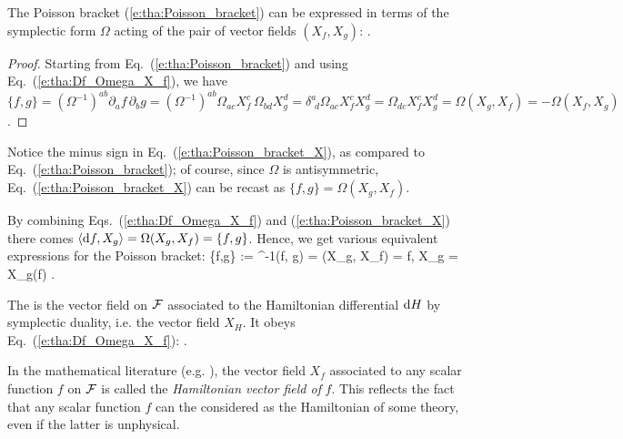 The Poisson bracket (\ref{e:tha:Poisson_bracket}) can be expressed
in terms of the symplectic form $\Omega$ acting of the pair of
vector fields $(X_f, X_g)$:
\be \label{e:tha:Poisson_bracket_X}
    .
\ee
\begin{proof}
Starting from Eq.~(\ref{e:tha:Poisson_bracket}) and using Eq.~(\ref{e:tha:Df_Omega_X_f}),
we have $\{f,g\} = (\Omega^{-1})^{ab} \partial_a f \, \partial_b g
= (\Omega^{-1})^{ab} \Omega_{ac} X_f^c \, \Omega_{bd} X_g^d
= \delta^a_{\ \, d}  \Omega_{ac} X_f^c X_g^d = \Omega_{dc}  X_f^c X_g^d = \Omega(X_g, X_f)
= -  \Omega(X_f, X_g)$.
\end{proof}
\begin{remark}
Notice the minus sign in Eq.~(\ref{e:tha:Poisson_bracket_X}), as compared to Eq.~(\ref{e:tha:Poisson_bracket}); of course,
since $\Omega$ is antisymmetric, Eq.~(\ref{e:tha:Poisson_bracket_X})
can be recast as $\{f,g\} = \Omega(X_g, X_f)$.
\end{remark}

By combining Eqs.~(\ref{e:tha:Df_Omega_X_f}) and (\ref{e:tha:Poisson_bracket_X})
there comes $\langle \mathrm{d} f, X_g \rangle = \Omega(X_g, X_f) = \{f,g\}$.
Hence, we get various equivalent expressions for the
Poisson bracket:
\be \label{e:tha:crochet_Poisson_equiv}
     \{f,g\} := \Omega^{-1}(\Dd f, \Dd g)  = \Omega(X_g, X_f)
     = \langle \Dd f, X_g \rangle = X_g(f) .
\ee


The  is
the vector field on $\mathcal{F}$ associated to the Hamiltonian differential $\mathrm{d} H$
by symplectic duality, i.e. the vector field $X_H$.
It obeys Eq.~(\ref{e:tha:Df_Omega_X_f}):
\be \label{e:tha:DH_Omega_X_H}
    .
\ee

\begin{remark}
In the mathematical literature (e.g. \cite{Lee13}), the vector field
$X_f$ associated to any scalar function $f$ on $\mathcal{F}$
is called the \emph{Hamiltonian vector field of} $f$. This reflects the
fact that any scalar function $f$ can the considered as the Hamiltonian
of some theory, even if the latter is unphysical.
\end{remark}

